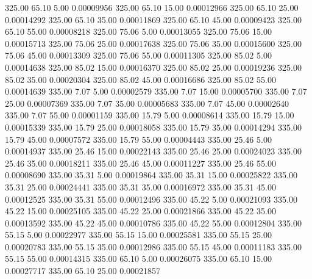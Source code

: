     325.00     65.10      5.00     0.00009956
    325.00     65.10     15.00     0.00012966
    325.00     65.10     25.00     0.00014292
    325.00     65.10     35.00     0.00011869
    325.00     65.10     45.00     0.00009423
    325.00     65.10     55.00     0.00008218
    325.00     75.06      5.00     0.00013055
    325.00     75.06     15.00     0.00015713
    325.00     75.06     25.00     0.00017638
    325.00     75.06     35.00     0.00015600
    325.00     75.06     45.00     0.00013309
    325.00     75.06     55.00     0.00011305
    325.00     85.02      5.00     0.00014638
    325.00     85.02     15.00     0.00016370
    325.00     85.02     25.00     0.00019236
    325.00     85.02     35.00     0.00020304
    325.00     85.02     45.00     0.00016686
    325.00     85.02     55.00     0.00014639
    335.00      7.07      5.00     0.00002579
    335.00      7.07     15.00     0.00005700
    335.00      7.07     25.00     0.00007369
    335.00      7.07     35.00     0.00005683
    335.00      7.07     45.00     0.00002640
    335.00      7.07     55.00     0.00001159
    335.00     15.79      5.00     0.00008614
    335.00     15.79     15.00     0.00015339
    335.00     15.79     25.00     0.00018058
    335.00     15.79     35.00     0.00014294
    335.00     15.79     45.00     0.00007572
    335.00     15.79     55.00     0.00004443
    335.00     25.46      5.00     0.00014937
    335.00     25.46     15.00     0.00022143
    335.00     25.46     25.00     0.00024023
    335.00     25.46     35.00     0.00018211
    335.00     25.46     45.00     0.00011227
    335.00     25.46     55.00     0.00008690
    335.00     35.31      5.00     0.00019864
    335.00     35.31     15.00     0.00025822
    335.00     35.31     25.00     0.00024441
    335.00     35.31     35.00     0.00016972
    335.00     35.31     45.00     0.00012525
    335.00     35.31     55.00     0.00012496
    335.00     45.22      5.00     0.00021093
    335.00     45.22     15.00     0.00025105
    335.00     45.22     25.00     0.00021866
    335.00     45.22     35.00     0.00013592
    335.00     45.22     45.00     0.00010786
    335.00     45.22     55.00     0.00012804
    335.00     55.15      5.00     0.00022977
    335.00     55.15     15.00     0.00025581
    335.00     55.15     25.00     0.00020783
    335.00     55.15     35.00     0.00012986
    335.00     55.15     45.00     0.00011183
    335.00     55.15     55.00     0.00014315
    335.00     65.10      5.00     0.00026075
    335.00     65.10     15.00     0.00027717
    335.00     65.10     25.00     0.00021857
